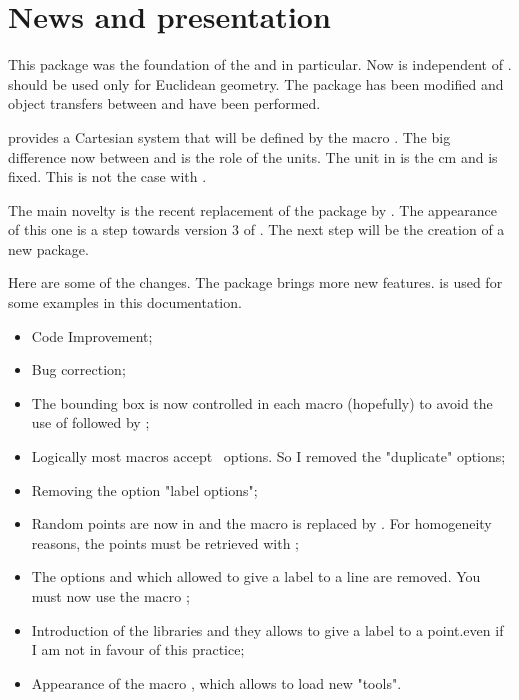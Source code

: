 \section{News and presentation}

This package was the foundation of the  and  in particular. Now  is independent of \tkzname{\tkznameofpack}.   should be used only for Euclidean geometry.  The package has been modified and object transfers between 
 and  have been performed. 

 provides a Cartesian system that will be defined by the macro . The big difference now between \tkzname{\tkznameofpack} and  is the role of the units. The unit in  is the cm and is fixed. This is not the case with .

The main novelty is the recent replacement of the  package by . The appearance of this one is a step towards version 3 of \LATEX.
 The next step will be the creation of a new package.

Here are some of the changes. The   package brings more new features.   is used for some examples in this documentation.

\vspace{2cm}
 \begin{itemize}\setlength{\itemsep}{10pt} 
\item  Code Improvement;
\item  Bug correction;
\item  The bounding box is now controlled in each macro (hopefully) to avoid the use of  followed by ;
\item  Logically most macros accept \TIKZ\ options. So I removed the "duplicate" options;
\item  Removing the option "label options";
\item  Random points are now in  and the macro  is replaced by . For homogeneity reasons, the points must be retrieved with ;
\item The options  and  which allowed to give a label to a line are removed. You must now use the macro ;

\item Introduction of the libraries  and  they allows to give a label to a point.even if I am not in favour of this practice;

\item Appearance of the macro , which allows to load new "tools".
\end{itemize}

\endinput